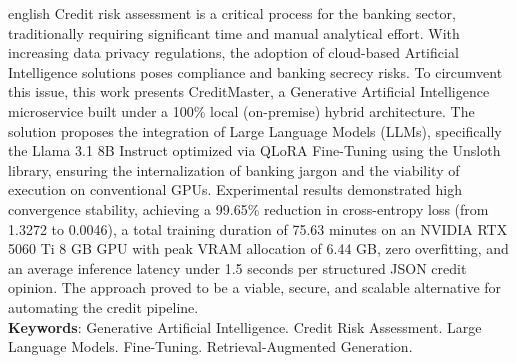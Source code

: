 \begin{resumo}[Abstract]
\begin{otherlanguage*}{english}
\hspace{1.5cm}
Credit risk assessment is a critical process for the banking sector, traditionally requiring significant time and manual analytical effort. With increasing data privacy regulations, the adoption of cloud-based Artificial Intelligence solutions poses compliance and banking secrecy risks. To circumvent this issue, this work presents CreditMaster, a Generative Artificial Intelligence microservice built under a 100\% local (on-premise) hybrid architecture. The solution proposes the integration of Large Language Models (LLMs), specifically the Llama 3.1 8B Instruct optimized via QLoRA Fine-Tuning using the Unsloth library, ensuring the internalization of banking jargon and the viability of execution on conventional GPUs. Experimental results demonstrated high convergence stability, achieving a 99.65\% reduction in cross-entropy loss (from 1.3272 to 0.0046), a total training duration of 75.63 minutes on an NVIDIA RTX 5060 Ti 8 GB GPU with peak VRAM allocation of 6.44 GB, zero overfitting, and an average inference latency under 1.5 seconds per structured JSON credit opinion. The approach proved to be a viable, secure, and scalable alternative for automating the credit pipeline.
\vspace{\onelineskip}
\noindent\\
\textbf{Keywords}: Generative Artificial Intelligence. Credit Risk Assessment. Large Language Models. Fine-Tuning. Retrieval-Augmented Generation.
\end{otherlanguage*}
\end{resumo}
